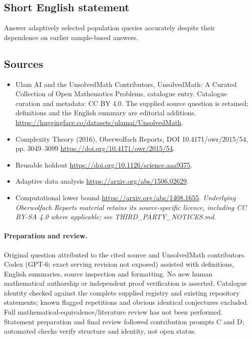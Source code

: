 \documentclass[11pt]{article}
\begin{document}
\subsection{Short English statement}
Answer adaptively selected population queries accurately despite their dependence on earlier sample-based answers.
\subsection{Sources}
\begin{itemize}
\item[\hypertarget{source:statement:1}{S1}] Ulam AI and the UnsolvedMath Contributors, UnsolvedMath: A Curated Collection of Open Mathematics Problems, catalogue entry. Catalogue curation and metadata: CC BY 4.0. The supplied source question is retained; definitions and the English summary are editorial additions.
\url{https://huggingface.co/datasets/ulamai/UnsolvedMath}.
\item[\hypertarget{source:statement:2}{S2}] Complexity Theory (2016), Oberwolfach Reports, DOI 10.4171/owr/2015/54, pp. 3049--3099
\url{https://doi.org/10.4171/owr/2015/54}.
\item[\hypertarget{source:statement:3}{S3}] Reusable holdout
\url{https://doi.org/10.1126/science.aaa9375}.
\item[\hypertarget{source:statement:4}{S4}] Adaptive data analysis
\url{https://arxiv.org/abs/1506.02629}.
\item[\hypertarget{source:statement:5}{S5}] Computational lower bound
\url{https://arxiv.org/abs/1408.1655}.
\textit{Underlying Oberwolfach Reports material retains its source-specific licence, including CC BY-SA 4.0 where applicable; see THIRD\_PARTY\_NOTICES.md.}
\end{itemize}
\paragraph{Preparation and review.}
Original question attributed to the cited source and UnsolvedMath contributors. Codex (GPT-6; exact serving revision not exposed) assisted with definitions, English summaries, source inspection and formatting. No new human mathematical authorship or independent proof verification is asserted. Catalogue identity checked against the complete supplied registry and existing repository statements; known flagged repetitions and obvious identical conjectures excluded. Full mathematical-equivalence/literature review has not been performed. Statement preparation and final review followed contribution prompts C and D; automated checks verify structure and identity, not open status.
\label{end:statement}
\end{document}
